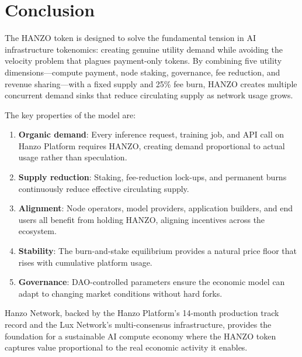 \section{Conclusion}

\label{sec:conclusion}

The HANZO token is designed to solve the fundamental tension in AI infrastructure
tokenomics: creating genuine utility demand while avoiding the velocity problem
that plagues payment-only tokens. By combining five utility dimensions---compute
payment, node staking, governance, fee reduction, and revenue sharing---with a
fixed supply and 25\% fee burn, HANZO creates multiple concurrent demand sinks
that reduce circulating supply as network usage grows.

The key properties of the model are:

\begin{enumerate}[leftmargin=1.4em]
    \item \textbf{Organic demand}: Every inference request, training job, and API
    call on Hanzo Platform requires HANZO, creating demand proportional to actual
    usage rather than speculation.
    \item \textbf{Supply reduction}: Staking, fee-reduction lock-ups, and
    permanent burns continuously reduce effective circulating supply.
    \item \textbf{Alignment}: Node operators, model providers, application
    builders, and end users all benefit from holding HANZO, aligning incentives
    across the ecosystem.
    \item \textbf{Stability}: The burn-and-stake equilibrium provides a natural
    price floor that rises with cumulative platform usage.
    \item \textbf{Governance}: DAO-controlled parameters ensure the economic model
    can adapt to changing market conditions without hard forks.
\end{enumerate}

Hanzo Network, backed by the Hanzo Platform's 14-month production track record
and the Lux Network's multi-consensus infrastructure, provides the foundation for
a sustainable AI compute economy where the HANZO token captures value
proportional to the real economic activity it enables.

